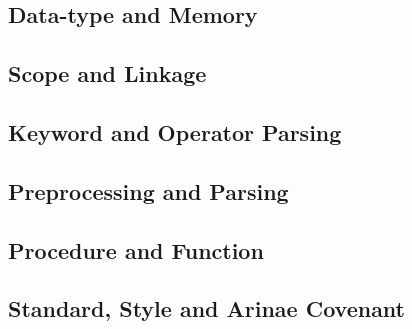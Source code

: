 \subsection{Data-type and Memory}


\subsection{Scope and Linkage}


\subsection{Keyword and Operator Parsing}


\subsection{Preprocessing and Parsing}


\subsection{Procedure and Function}


\subsection{Standard, Style and Arinae Covenant}



